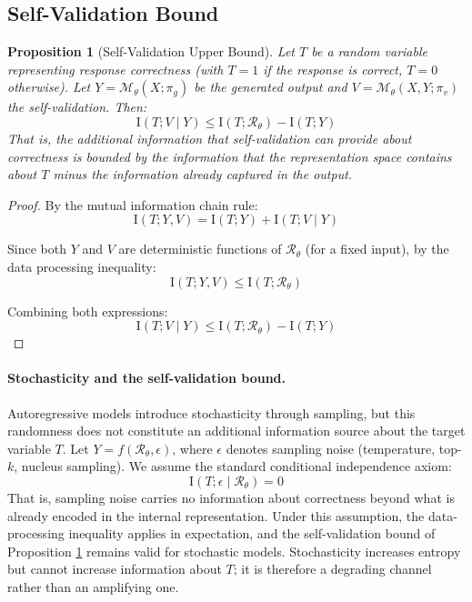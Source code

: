 \documentclass[11pt,a4paper]{article}
\newtheorem{proposition}{Proposition}[section]
\theoremstyle{remark}
\newcommand{\MI}{\mathrm{I}}
\begin{document}
\subsection{Self-Validation Bound}

\begin{proposition}[Self-Validation Upper Bound]
\label{prop:bound}
Let $T$ be a random variable representing response correctness (with $T = 1$ if the response is correct, $T = 0$ otherwise). Let $Y = \mathcal{M}_\theta(X; \pi_g)$ be the generated output and $V = \mathcal{M}_\theta(X, Y; \pi_v)$ the self-validation. Then:
\begin{equation}
  \MI(T; V \mid Y) \leq \MI(T; \mathcal{R}_\theta) - \MI(T; Y)
\end{equation}
That is, the additional information that self-validation can provide about correctness is bounded by the information that the representation space contains about $T$ minus the information already captured in the output.
\end{proposition}

\begin{proof}
By the mutual information chain rule:
\begin{equation}
  \MI(T; Y, V) = \MI(T; Y) + \MI(T; V \mid Y)
\end{equation}

Since both $Y$ and $V$ are deterministic functions of $\mathcal{R}_\theta$ (for a fixed input), by the data processing inequality:
\begin{equation}
  \MI(T; Y, V) \leq \MI(T; \mathcal{R}_\theta)
\end{equation}

Combining both expressions:
\begin{equation}
  \MI(T; V \mid Y) \leq \MI(T; \mathcal{R}_\theta) - \MI(T; Y)
\end{equation}
\end{proof}

\paragraph{Stochasticity and the self-validation bound.} Autoregressive models introduce stochasticity through sampling, but this randomness does not constitute an additional information source about the target variable $T$. Let $Y = f(\mathcal{R}_\theta, \epsilon)$, where $\epsilon$ denotes sampling noise (temperature, top-$k$, nucleus sampling). We assume the standard conditional independence axiom:
\begin{equation}
\label{eq:stochastic}
  \MI(T; \epsilon \mid \mathcal{R}_\theta) = 0
\end{equation}
That is, sampling noise carries no information about correctness beyond what is already encoded in the internal representation. Under this assumption, the data-processing inequality applies in expectation, and the self-validation bound of Proposition \ref{prop:bound} remains valid for stochastic models. Stochasticity increases entropy but cannot increase information about $T$; it is therefore a degrading channel rather than an amplifying one.
\end{document}
